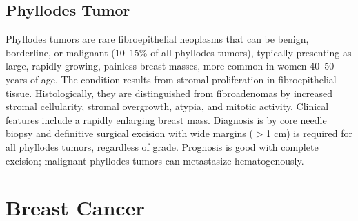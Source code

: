\subsection{Phyllodes Tumor}
\label{sec:Phyllodes Tumor}
Phyllodes tumors are rare fibroepithelial neoplasms that can be benign, borderline, or malignant (10--15\% of all phyllodes tumors), typically presenting as large, rapidly growing, painless breast masses, more common in women 40--50 years of age. The condition results from stromal proliferation in fibroepithelial tissue. Histologically, they are distinguished from fibroadenomas by increased stromal cellularity, stromal overgrowth, atypia, and mitotic activity. Clinical features include a rapidly enlarging breast mass. Diagnosis is by core needle biopsy and definitive surgical excision with wide margins ($>$1 cm) is required for all phyllodes tumors, regardless of grade. Prognosis is good with complete excision; malignant phyllodes tumors can metastasize hematogenously.

\section{Breast Cancer}








\label{sec:section:Breast Cancer}

